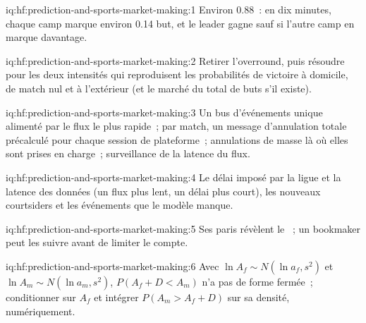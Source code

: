 \begin{solution}{iq:hf:prediction-and-sports-market-making:1}
Environ 0.88~: en dix minutes, chaque camp marque environ 0.14 but, et le leader gagne sauf si l'autre camp en marque davantage.
\end{solution}

\begin{solution}{iq:hf:prediction-and-sports-market-making:2}
Retirer l'overround, puis résoudre pour les deux intensités qui reproduisent les probabilités de victoire à domicile, de match nul et à l'extérieur (et le marché du total de buts s'il existe).
\end{solution}

\begin{solution}{iq:hf:prediction-and-sports-market-making:3}
Un bus d'événements unique alimenté par le flux le plus rapide~; par match, un message d'annulation totale précalculé pour chaque session de plateforme~; annulations de masse là où elles sont prises en charge~; surveillance de la
latence du flux.
\end{solution}

\begin{solution}{iq:hf:prediction-and-sports-market-making:4}
Le délai imposé par la ligue et la latence des données (un flux plus lent, un délai plus court), les nouveaux courtsiders et les événements que le modèle manque.
\end{solution}

\begin{solution}{iq:hf:prediction-and-sports-market-making:5}
Ses paris révèlent le ~; un bookmaker peut les suivre avant de limiter le compte.
\end{solution}

\begin{solution}{iq:hf:prediction-and-sports-market-making:6}
Avec $\ln A_f\sim N(\ln a_f,s^2)$ et $\ln A_m\sim N(\ln a_m,s^2)$, $P(A_f+D<A_m)$ n'a pas de forme fermée~; conditionner sur $A_f$ et intégrer
$P(A_m>A_f+D)$ sur sa densité, numériquement.
\end{solution}
